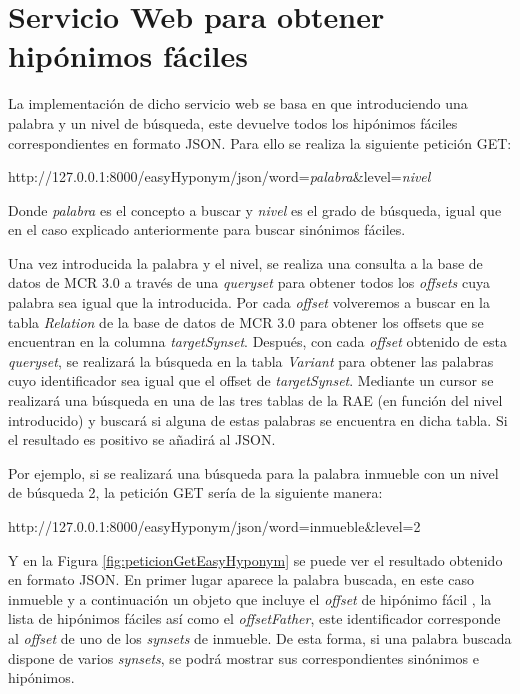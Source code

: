 


\section{Servicio Web  para obtener hipónimos fáciles}

La implementación de dicho servicio web se basa en que introduciendo una palabra y un nivel de búsqueda, este devuelve todos los hipónimos fáciles correspondientes en formato JSON. Para ello se realiza la siguiente petición GET:

http://127.0.0.1:8000/easyHyponym/json/word=\textit{palabra}\&level=\textit{nivel}

Donde \textit{palabra} es el concepto a buscar y \textit{nivel} es el grado de búsqueda, igual que en el caso explicado anteriormente para buscar sinónimos fáciles.

Una vez introducida la palabra y el nivel, se realiza una consulta a la base de datos de MCR 3.0 a través de una \textit{queryset} para obtener todos los \textit{offsets} cuya palabra sea igual que la introducida.
Por cada \textit{offset} volveremos a buscar en la tabla \textit{Relation} de la base de datos de MCR 3.0 para obtener los offsets que se encuentran en la columna \textit{targetSynset}. Después, con cada \textit{offset} obtenido de esta \textit{queryset}, se realizará la búsqueda en la tabla \textit{Variant} para obtener las palabras cuyo identificador sea igual que el offset de \textit{targetSynset}.
Mediante un cursor se realizará una búsqueda en una de las tres tablas de la RAE (en función del nivel introducido) y buscará si alguna de estas palabras se encuentra en dicha tabla.
Si el resultado es positivo se añadirá al JSON.

Por ejemplo, si se realizará una búsqueda para la palabra inmueble con un nivel de búsqueda 2, la petición GET sería de la siguiente manera:

http://127.0.0.1:8000/easyHyponym/json/word=inmueble\&level=2

Y en la Figura \ref{fig:peticionGetEasyHyponym} se puede ver el resultado obtenido en formato JSON. En primer lugar aparece la palabra buscada, en este caso inmueble y a continuación un objeto que incluye el \textit{offset} de hipónimo fácil , la lista de hipónimos fáciles así como el \textit{offsetFather}, este identificador corresponde al \textit{offset} de uno de los \textit{synsets} de inmueble. De esta forma, si una palabra buscada dispone de varios \textit{synsets}, se podrá mostrar sus correspondientes sinónimos e hipónimos.


